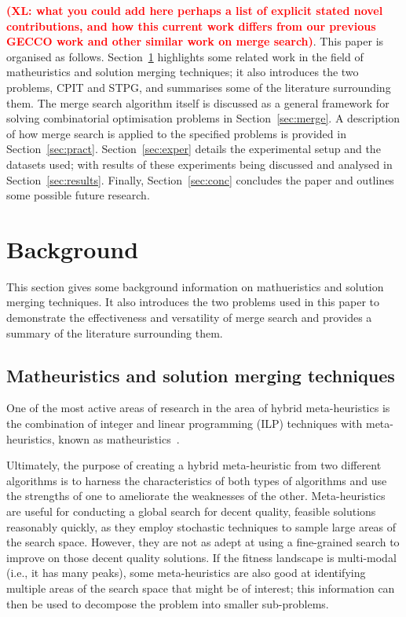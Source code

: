 \documentclass[preprint]{elsarticle}
\newcommand{\xl}[1]{\textbf{\textcolor{red}{(XL: #1)}}}
\begin{document}
\xl{what you could add here perhaps a list of explicit stated novel contributions, and how this current work differs from our previous GECCO work and other similar work on merge search}.
This paper is organised as follows. Section~\ref{sec:back} highlights some related work in the field of matheuristics and solution merging techniques; it also introduces the two problems, CPIT and STPG, and summarises some of the literature surrounding them. The merge search algorithm itself is discussed as a general framework for solving combinatorial optimisation problems in Section~\ref{sec:merge}. A description of how merge search is applied to the specified problems is provided in Section~\ref{sec:pract}. Section~\ref{sec:exper} details the experimental setup and the datasets used; with results of these experiments being discussed and analysed in Section~\ref{sec:results}. Finally, Section~\ref{sec:conc} concludes the paper and outlines some possible future research.

\section{Background}\label{sec:back}
This section gives some background information on mathueristics and solution merging techniques.
It also introduces the two problems used in this paper to demonstrate the effectiveness and versatility of merge search and provides a summary of the literature surrounding them.

\subsection{Matheuristics and solution merging techniques}
One of the most active areas of research in the area of hybrid meta-heuristics is the combination of integer and linear programming (ILP) techniques with meta-heuristics, known as matheuristics~\citep{matheuristics}.  

Ultimately, the purpose of creating a hybrid meta-heuristic from two different algorithms is to harness the characteristics of both types of algorithms and use the strengths of one to ameliorate the weaknesses of the other. Meta-heuristics are useful for conducting a global search for decent quality, feasible solutions reasonably quickly, as they employ stochastic techniques to sample large areas of the search space. However, they are not as adept at using a fine-grained search to improve on those decent quality solutions. If the fitness landscape is multi-modal (i.e., it has many peaks), some meta-heuristics are also good at identifying multiple areas of the search space that might be of interest; this information can then be used to decompose the problem into smaller sub-problems. 
\end{document}
